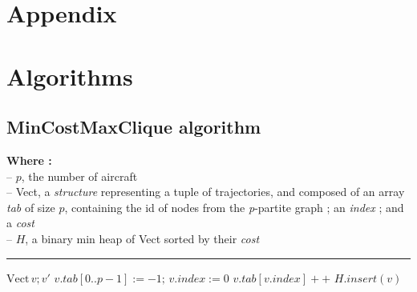 \documentclass[a4paper]{article}
\begin{document}
\clearpage
\section{Appendix}
\appendix

\section{Algorithms} 

\subsection{MinCostMaxClique algorithm}

\begin{algorithm}[H]
    \caption{MinCostMaxClique}
    \label{algo:mcmc}
    
    \parbox{\linewidth}{
        \textbf{Where :} \\
        -- $p$, the number of aircraft \\
        -- Vect, a \textit{structure} representing a tuple of trajectories, and composed of an array \textit{tab} of size $p$, containing the id of nodes from the \textit{p}-partite graph ; an \textit{index} ; and a \textit{cost} \\
        -- $H$, a binary min heap of Vect sorted by their \textit{cost}
    }
    
    \vspace{0.3cm}
    \hrule
    \vspace{0.2cm}

    $\text{Vect}\, v; v'$\;
    $v.tab[0 .. p-1] := -1;\, v.index := 0$\;
    $v.tab[v.index]++$\;
    $H.insert(v)$\;
    \;    
\end{algorithm}

\vspace{1cm}


\clearpage 
\printbibliography
\end{document}
